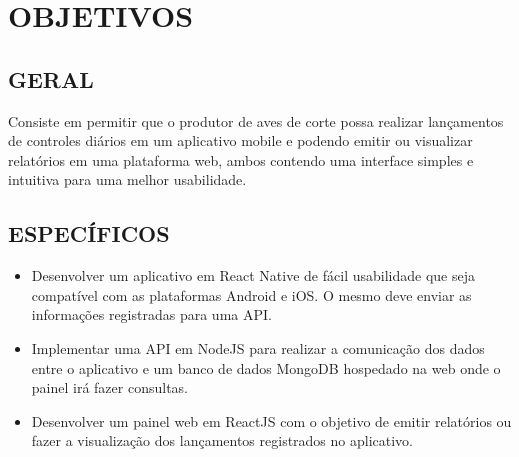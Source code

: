 
\chapter{OBJETIVOS}
\label{chap:objetivos}

\section{GERAL}
\label{subsec:objgeral}
Consiste em permitir que o produtor de aves de corte possa realizar lançamentos de controles diários em um aplicativo mobile e podendo emitir ou visualizar relatórios em uma plataforma web, ambos contendo uma interface simples e intuitiva para uma melhor usabilidade.



\section{ESPECÍFICOS}
\label{subsec:objesp}

\begin{itemize}
   \item Desenvolver um aplicativo em React Native de fácil usabilidade que seja compatível com as plataformas Android e iOS. O mesmo deve enviar as informações registradas para uma API.
   \item Implementar uma API em NodeJS para realizar a comunicação dos dados entre o aplicativo e um banco de dados MongoDB hospedado na web onde o painel irá fazer consultas.
   \item Desenvolver um painel web em ReactJS com o objetivo de emitir relatórios ou fazer a visualização dos lançamentos registrados no aplicativo.
 \end{itemize}







